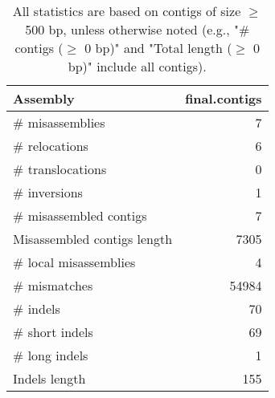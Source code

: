 \documentclass[12pt,a4paper]{article}
\begin{document}
\begin{table}[ht]
\begin{center}
\caption{All statistics are based on contigs of size $\geq$ 500 bp, unless otherwise noted (e.g., "\# contigs ($\geq$ 0 bp)" and "Total length ($\geq$ 0 bp)" include all contigs).}
\begin{tabular}{|l*{1}{|r}|}
\hline
Assembly & final.contigs \\ \hline
\# misassemblies & 7 \\ \hline
\hspace{5mm}\# relocations & 6 \\ \hline
\hspace{5mm}\# translocations & 0 \\ \hline
\hspace{5mm}\# inversions & 1 \\ \hline
\# misassembled contigs & 7 \\ \hline
Misassembled contigs length & 7305 \\ \hline
\# local misassemblies & 4 \\ \hline
\# mismatches & 54984 \\ \hline
\# indels & 70 \\ \hline
\hspace{5mm}\# short indels & 69 \\ \hline
\hspace{5mm}\# long indels & 1 \\ \hline
Indels length & 155 \\ \hline
\end{tabular}
\end{center}
\end{table}
\end{document}
